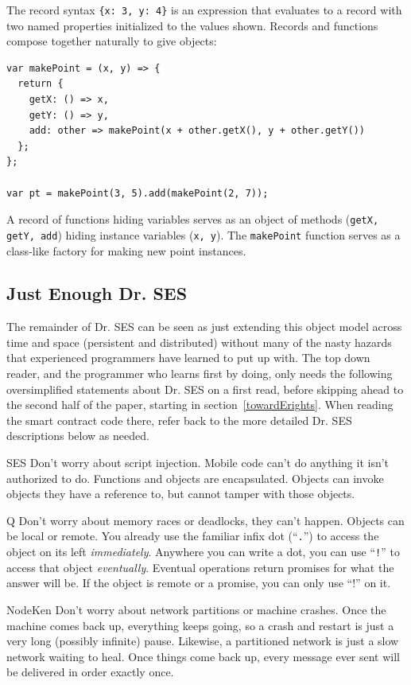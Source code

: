 \documentclass{llncs}
\begin{document}
The record syntax {\tt \{x: 3, y: 4\}} is an expression that evaluates to a record with two named properties initialized to the values shown. Records and functions compose together naturally to give objects:

\begin{verbatim}
var makePoint = (x, y) => {
  return {
    getX: () => x,
    getY: () => y,
    add: other => makePoint(x + other.getX(), y + other.getY())
  };
};

var pt = makePoint(3, 5).add(makePoint(2, 7));
\end{verbatim}

A record of functions hiding variables serves as an object of methods ({\tt getX, getY, add}) hiding instance variables ({\tt x, y}). The {\tt makePoint} function serves as a class-like factory for making new point instances.

\subsection{Just Enough Dr. SES}

The remainder of Dr. SES can be seen as just extending this object model across time and space (persistent and distributed) without many of the nasty hazards that experienced programmers have learned to put up with. The top down reader, and the programmer who learns first by doing, only needs the following oversimplified statements about Dr. SES on a first read, before skipping ahead to the second half of the paper, starting in section~\ref{towardErights}. When reading the smart contract code there, refer back to the more detailed Dr. SES descriptions below as needed. 

\begin{description*}
\item[SES] Don't worry about script injection. Mobile code can't do anything it isn't authorized to do. Functions and objects are encapsulated. Objects can invoke objects they have a reference to, but cannot tamper with those objects.

\item{Q} Don't worry about memory races or deadlocks, they can't happen. Objects can be local or remote. You already use the familiar infix dot (``{\tt .}'') to access the object on its left \emph{immediately}. Anywhere you can write a dot, you can use ``{\tt !}'' to access that object \emph{eventually}. Eventual operations return promises for what the answer will be. If the object is remote or a promise, you can only use ``{!}'' on it.

\item[NodeKen] Don't worry about network partitions or machine crashes. Once the machine comes back up, everything keeps going, so a crash and restart is just a very long (possibly infinite) pause. Likewise, a partitioned network is just a slow network waiting to heal. Once things come back up, every message ever sent will be delivered in order exactly once.
\end{description*}
\end{document}
